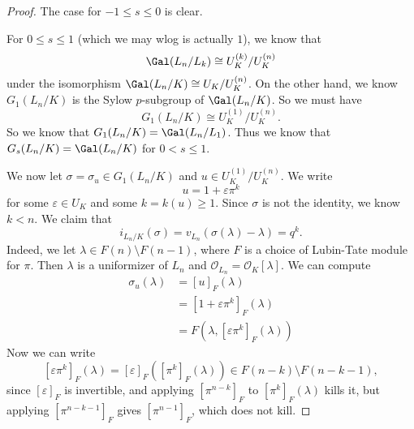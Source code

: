 \documentclass[a4paper]{article}
\begin{document}
\begin{proof}
  The case for $-1 \leq s \leq 0$ is clear.

  For $0 \leq s \leq 1$ (which we may wlog is actually $1$), we know that
  \[
    \Gal(L_n/L_k) \cong U_K^{(k)}/U_K^{(n)}
  \]
  under the isomorphism $\Gal(L_n/K) \cong U_K/U_K^{(n)}$. On the other hand, we know $G_1(L_n/K)$ is the Sylow $p$-subgroup of $\Gal(L_n/K)$. So we must have
  \[
    G_1(L_n/K) \cong U_K^{(1)}/U_K^{(n)}.
  \]
  So we know that $G_1(L_n/K) = \Gal(L_n/L_1)$. Thus we know that $G_s(L_n/K) = \Gal(L_n/K)$ for $0 < s \leq 1$.

  \separator

  We now let $\sigma = \sigma_u \in G_1(L_n/K)$ and $u \in U_K^{(1)}/U_K^{(n)}$. We write
  \[
    u = 1 + \varepsilon \pi^k
  \]
  for some $\varepsilon \in U_K$ and some $k = k(u) \geq 1$. Since $\sigma$ is not the identity, we know $k < n$.
  We claim that
  \[
    i_{L_n/K}(\sigma) = v_{L_n}(\sigma(\lambda) - \lambda) = q^k.
  \]
  Indeed, we let $\lambda \in F(n) \setminus F(n - 1)$, where $F$ is a choice of Lubin-Tate module for $\pi$. Then $\lambda$ is a uniformizer of $L_n$ and $\mathcal{O}_{L_n} = \mathcal{O}_K[\lambda]$. We can compute
  \begin{align*}
    \sigma_u(\lambda) &= [u]_F (\lambda) \\
    &= [1 + \varepsilon \pi^k]_F(\lambda) \\
    &= F(\lambda, [\varepsilon \pi^k]_F(\lambda))
  \end{align*}
  Now we can write
  \[
    [\varepsilon \pi^k]_F (\lambda) = [\varepsilon]_F ([\pi^k]_F(\lambda)) \in F(n - k) \setminus F(n - k - 1),
  \]
  since $[\varepsilon]_F$ is invertible, and applying $[\pi^{n - k}]_F$ to $[\pi^k]_F (\lambda)$ kills it, but applying $[\pi^{n - k - 1}]_F$ gives $[\pi^{n- 1}]_F$, which does not kill.


\end{proof}
\end{document}

